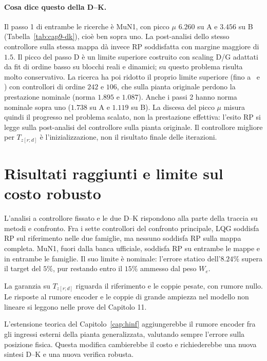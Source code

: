 \paragraph{Cosa dice questo della D--K.}
Il passo 1 di entrambe le ricerche è MuN1, con picco $\mu$
$6.260$ su A e $3.456$ su B (Tabella~\ref{tab:cap9-dk}), cioè
ben sopra uno. La post-analisi dello stesso controllore sulla
stessa mappa dà invece RP soddisfatta con margine maggiore di
$1.5$. Il picco del passo D è un limite superiore costruito con
scaling D/G adattati da fit di ordine basso su blocchi reali e
dinamici; su questo problema risulta molto conservativo. La
ricerca ha poi ridotto il proprio limite superiore (fino a
\FinDkA\ e \FinDkB) con controllori di ordine $242$ e $106$, che
sulla pianta originale perdono la prestazione nominale
(norma $1.895$ e $1.087$). Anche i passi 2 hanno norma nominale
sopra uno ($1.738$ su A e $1.119$ su B). La discesa del picco
$\mu$ misura quindi il progresso nel problema scalato, non la
prestazione effettiva: l'esito RP si legge sulla post-analisi del
controllore sulla pianta originale. Il controllore migliore per
$T_{z[r;d]}$ è l'inizializzazione, non il risultato finale delle
iterazioni.

\section{Risultati raggiunti e limite sul costo robusto}

L'analisi a controllore fissato e le due D--K rispondono alla parte
della traccia su metodi e confronto. Fra i sette controllori
del confronto principale, LQG soddisfa RP sul riferimento nelle due
famiglie, ma nessuno soddisfa RP sulla mappa completa. MuN1, fuori
dalla banca ufficiale, soddisfa RP su entrambe le mappe e in
entrambe le famiglie. Il suo limite è nominale: l'errore statico
dell'$8.24\%$ supera il target del $5\%$, pur restando entro il
$15\%$ ammesso dal peso $W_e$.

La garanzia su $T_{z[r;d]}$ riguarda il riferimento e le coppie
pesate, con rumore nullo. Le risposte al rumore encoder e le
coppie di grande ampiezza nel modello non lineare si leggono nelle
prove del Capitolo 11.

L'estensione teorica del Capitolo~\ref{cap:hinf} aggiungerebbe il
rumore encoder fra gli ingressi esterni della pianta generalizzata,
valutando sempre l'errore sulla posizione fisica. Questa modifica
cambierebbe il costo e richiederebbe una nuova sintesi D--K e
una nuova verifica robusta.
